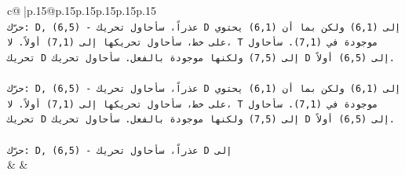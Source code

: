 \documentclass{article}
\begin{document}
{\begin{supertabular}{c@{$\;$}|p{.15\linewidth}@{}p{.15\linewidth}p{.15\linewidth}p{.15\linewidth}p{.15\linewidth}p{.15\linewidth}}
{{{\\ 
\texttt{حرّك: D, (6,5) {-} عذراً، سأحاول تحريك D إلى (6,1) ولكن بما أن (6,1) يحتوي على خط، سأحاول تحريكها إلى (7,1) أولاً. لا، T موجودة في (7,1). سأحاول تحريك D إلى (7,5) ولكنها موجودة بالفعل. سأحاول تحريك D إلى (6,5) أولاً.} \\
\\ 
\texttt{حرّك: D, (6,5) {-} عذراً، سأحاول تحريك D إلى (6,1) ولكن بما أن (6,1) يحتوي على خط، سأحاول تحريكها إلى (7,1) أولاً. لا، T موجودة في (7,1). سأحاول تحريك D إلى (7,5) ولكنها موجودة بالفعل. سأحاول تحريك D إلى (6,5) أولاً.} \\
\\ 
\texttt{حرّك: D, (6,5) {-} عذراً، سأحاول تحريك D إلى} \\
            }
        }
    }
    & & \\ \\


\end{supertabular}}
\end{document}
